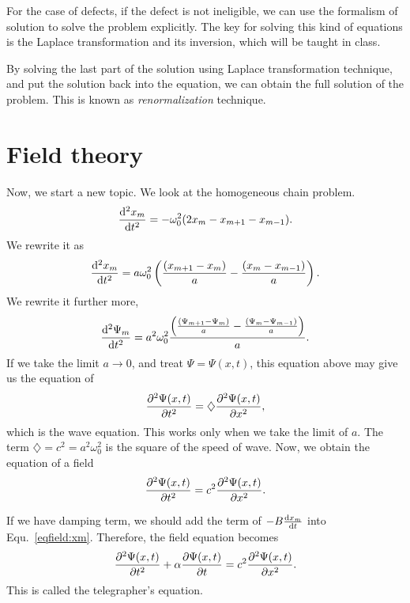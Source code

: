 For the case of defects, if the defect is not ineligible, we can use the formalism of solution to solve the problem explicitly. The key for solving this kind of equations is the Laplace transformation and its inversion, which will be taught in class.

By solving the last part of the solution using Laplace transformation technique, and put the solution back into the equation, we can obtain the full solution of the problem. This is known as \textit{renormalization} technique. 

\section{Field theory}\label{sec:field}
Now, we start a new topic. We look at the homogeneous chain problem.
\begin{align}
\frac{{\mathrm d}^2 {x_m}}{{\mathrm d}t^2}= -\omega_0^2 (2x_m-x_{m+1}-x_{m-1} ).\label{eqfield:xm}
\end{align}
We rewrite it as
\begin{align}
\frac{{\mathrm d}^2 {x_m}}{{\mathrm d}t^2}= a \omega_0^2 \left( \frac{(x_{m+1}-x_m)}{a}-\frac{(x_m-x_{m-1})}{a} \right).
\end{align}
We rewrite it further more,
\begin{align}
\frac{{\mathrm d}^2 {\Psi_m}}{{\mathrm d}t^2}= a^2 \omega_0^2 \frac{\left( \frac{(\Psi_{m+1}-\Psi_m)}{a}-\frac{(\Psi_m-\Psi_{m-1})}{a} \right)}{a}.
\end{align}
If we take the limit $ a\rightarrow 0$, and treat $ \Psi=\Psi(x,t) $, this equation above may give us the equation of
\begin{align}
\frac{\partial^2 {\Psi(x,t)}}{\partial t^2}=\diamondsuit  \frac{\partial^2 {\Psi(x,t)}}{\partial {x}^2},
\end{align}
which is the wave equation. This works only when we take the limit of $ a $. The term $ \diamondsuit=c^2=a^2\omega_0^2 $ is the square of the speed of wave. Now, we obtain the equation of a field
\begin{align}
\frac{\partial^2 {\Psi(x,t)}}{\partial t^2}=c^2  \frac{\partial^2 {\Psi(x,t)}}{\partial {x}^2}.
\end{align}

If we have damping term, we should add the term of $ -B\frac{{\mathrm d} {x_m}}{{\mathrm d}t} $ into Equ.~\ref{eqfield:xm}. Therefore, the field equation becomes
\begin{align}
\frac{\partial^2 {\Psi(x,t)}}{\partial t^2}+\alpha \frac{\partial {\Psi(x,t)}}{\partial t}=c^2  \frac{\partial^2 {\Psi(x,t)}}{\partial {x}^2}.
\end{align}
This is called the telegrapher's equation. 

